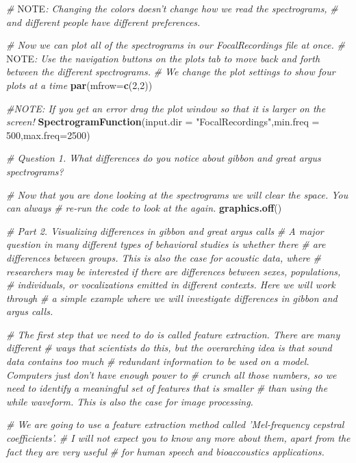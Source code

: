 \documentclass[]{book}
\newenvironment{Shaded}{\begin{snugshade}}{\end{snugshade}}
\newcommand{\AlertTok}[1]{\textcolor[rgb]{0.94,0.16,0.16}{#1}}
\newcommand{\CommentTok}[1]{\textcolor[rgb]{0.56,0.35,0.01}{\textit{#1}}}
\newcommand{\DataTypeTok}[1]{\textcolor[rgb]{0.13,0.29,0.53}{#1}}
\newcommand{\DecValTok}[1]{\textcolor[rgb]{0.00,0.00,0.81}{#1}}
\newcommand{\KeywordTok}[1]{\textcolor[rgb]{0.13,0.29,0.53}{\textbf{#1}}}
\newcommand{\NormalTok}[1]{#1}
\newcommand{\StringTok}[1]{\textcolor[rgb]{0.31,0.60,0.02}{#1}}
\begin{document}
\begin{Shaded}
\begin{Highlighting}[]
\CommentTok{# }\AlertTok{NOTE}\CommentTok{: Changing the colors doesn't change how we read the spectrograms,}
\CommentTok{# and different people have different preferences.}

\CommentTok{# Now we can plot all of the spectrograms in our FocalRecordings file at once.}
\CommentTok{# }\AlertTok{NOTE}\CommentTok{: Use the navigation buttons on the plots tab to move back and forth between the different spectrograms.}
\CommentTok{# We change the plot settings to show four plots at a time}
\KeywordTok{par}\NormalTok{(}\DataTypeTok{mfrow=}\KeywordTok{c}\NormalTok{(}\DecValTok{2}\NormalTok{,}\DecValTok{2}\NormalTok{))}

\CommentTok{#NOTE: If you get an error drag the plot window so that it is larger on the screen!}
\KeywordTok{SpectrogramFunction}\NormalTok{(}\DataTypeTok{input.dir =} \StringTok{"FocalRecordings"}\NormalTok{,}\DataTypeTok{min.freq =} \DecValTok{500}\NormalTok{,}\DataTypeTok{max.freq=}\DecValTok{2500}\NormalTok{)}

\CommentTok{# Question 1. What differences do you notice about gibbon and great argus spectrograms?}

\CommentTok{# Now that you are done looking at the spectrograms we will clear the space. You can always}
\CommentTok{# re-run the code to look at the again.}
\KeywordTok{graphics.off}\NormalTok{()}

\CommentTok{# Part 2. Visualizing differences in gibbon and great argus calls}
\CommentTok{# A major question in many different types of behavioral studies is whether there}
\CommentTok{# are differences between groups. This is also the case for acoustic data, where }
\CommentTok{# researchers may be interested if there are differences between sexes, populations,}
\CommentTok{# individuals, or vocalizations emitted in different contexts. Here we will work through}
\CommentTok{# a simple example where we will investigate differences in gibbon and argus calls.}

\CommentTok{# The first step that we need to do is called feature extraction. There are many different}
\CommentTok{# ways that scientists do this, but the overarching idea is that sound data contains too much}
\CommentTok{# redundant information to be used on a model. Computers just don't have enough power to }
\CommentTok{# crunch all those numbers, so we need to identify a meaningful set of features that is smaller}
\CommentTok{# than using the while waveform. This is also the case for image processing.}

\CommentTok{# We are going to use a feature extraction method called 'Mel-frequency cepstral coefficients'.}
\CommentTok{# I will not expect you to know any more about them, apart from the fact they are very useful}
\CommentTok{# for human speech and bioaccoustics applications. }


\end{Highlighting}
\end{Shaded}
\end{document}
